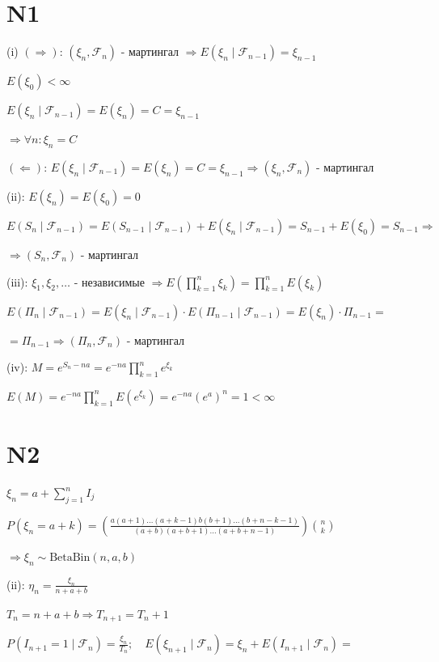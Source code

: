 \documentclass{article}
\begin{document}
\section*{N1}

(i) $(\Rightarrow)$: $(\xi_n, \mathcal{F}_n)$ - мартингал $\Rightarrow E(\xi_n \mid \mathcal{F}_{n-1}) = \xi_{n-1}$

$E(\xi_0) < \infty$

$E(\xi_n \mid \mathcal{F}_{n-1}) = E(\xi_n) = C = \xi_{n-1}$

$\Rightarrow \forall n: \xi_n = C$

$(\Leftarrow)$: $E(\xi_n \mid \mathcal{F}_{n-1}) = E(\xi_n) = C = \xi_{n-1} \Rightarrow (\xi_n, \mathcal{F}_n)$ - мартингал

(ii): $E(\xi_n) = E(\xi_0) = 0$

$E(S_n \mid \mathcal{F}_{n-1}) = E(S_{n-1} \mid \mathcal{F}_{n-1}) + E(\xi_n \mid \mathcal{F}_{n-1}) = S_{n-1} + E(\xi_0) = S_{n-1} \Rightarrow$

$\Rightarrow (S_n, \mathcal{F}_n)$ - мартингал

(iii): $\xi_1, \xi_2, \dots$ - независимые $\Rightarrow E\left(\prod_{k=1}^n \xi_k\right) = \prod_{k=1}^n E(\xi_k)$

$E(\Pi_n \mid \mathcal{F}_{n-1}) = E(\xi_n \mid \mathcal{F}_{n-1}) \cdot E(\Pi_{n-1} \mid \mathcal{F}_{n-1}) = E(\xi_n) \cdot \Pi_{n-1} =$

$= \Pi_{n-1} \Rightarrow (\Pi_n, \mathcal{F}_n)$ - мартингал

(iv): $M = e^{S_n - na} = e^{-na} \prod_{k=1}^n e^{\xi_k}$

$E(M) = e^{-na} \prod_{k=1}^n E(e^{\xi_k}) = e^{-na} (e^a)^n = 1 < \infty$

\section*{N2}

$\xi_n = a + \sum_{j=1}^n I_j$

$P(\xi_n = a+k) = \left( \frac{a(a+1)\dots(a+k-1) b(b+1)\dots(b+n-k-1)}{(a+b)(a+b+1)\dots(a+b+n-1)} \right) \binom{n}{k}$

$\Rightarrow \xi_n \sim \text{BetaBin}(n, a, b)$

(ii): $\eta_n = \frac{\xi_n}{n+a+b}$

$T_n = n+a+b \Rightarrow T_{n+1} = T_n + 1$

$P(I_{n+1}=1 \mid \mathcal{F}_n) = \frac{\xi_n}{T_n} ; \quad E(\xi_{n+1} \mid \mathcal{F}_n) = \xi_n + E(I_{n+1} \mid \mathcal{F}_n) =$
\end{document}
